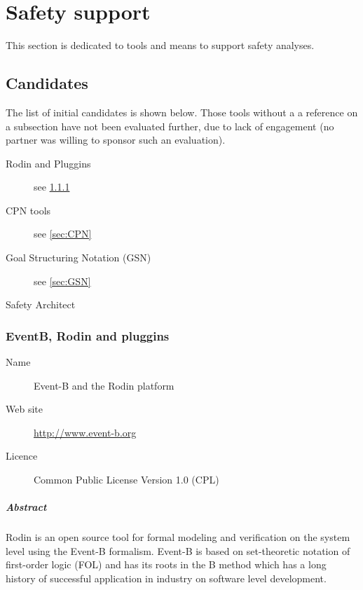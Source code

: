 

\chapter{Safety support}
\label{sec:safety}

This section is dedicated to tools and means to support safety analyses.


\section{Candidates}

The list of initial candidates is shown below.  Those tools without a a reference on a subsection have not been evaluated further, due to lack of engagement (no partner was willing to sponsor such an evaluation).

\begin{description}
\item [Rodin and Pluggins] see \ref{sec:eventb_safe}
\item [CPN tools] see \ref{sec:CPN}
\item [Goal Structuring Notation (GSN)] see \ref{sec:GSN}
\item [Safety Architect]
\end{description}

\subsection{EventB, Rodin and pluggins}
\label{sec:eventb_safe}

\begin{description}
\item[Name] Event-B and the Rodin platform
\item[Web site] \url{http://www.event-b.org}
\item[Licence] Common Public License Version 1.0 (CPL)
\end{description}

\paragraph{Abstract}

Rodin is an open source tool for formal modeling and verification on the system
level using the Event-B formalism. Event-B is based on set-theoretic notation of
first-order logic (FOL) and has its roots in the B method which has a long
history of successful application in industry on software level development.

